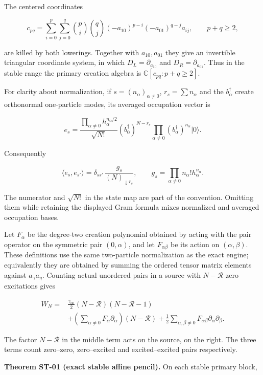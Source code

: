 \documentclass[a4paper,11pt]{article}
\numberwithin{equation}{section}
\begin{document}
The centered coordinates

\[
c_{pq}=\sum_{i=0}^{p}\sum_{j=0}^{q}
\binom{p}{i}\binom{q}{j}(-a_{10})^{p-i}(-a_{01})^{q-j}a_{ij},
\qquad p+q\geq2,
\]

are killed by both lowerings. Together with \(a_{10},a_{01}\) they give an invertible triangular coordinate system, in which \(D_L=\partial_{a_{10}}\) and \(D_R=\partial_{a_{01}}\). Thus in the stable range the primary creation algebra is \(\mathbb C[c_{pq}:p+q\geq2]\).

For clarity about normalization, if \(s=(n_\alpha)_{\alpha\ne0}\), \(r_s=\sum n_\alpha\) and the \(b_\alpha^\dagger\) create orthonormal one-particle modes, its averaged occupation vector is

\[
e_s=
\frac{\prod_{\alpha\ne0}h_\alpha^{n_\alpha/2}}{\sqrt{N!}}
(b_0^\dagger)^{N-r_s}
\prod_{\alpha\ne0}(b_\alpha^\dagger)^{n_\alpha}|0\rangle.
\]

Consequently

\[
\langle e_s,e_{s'}\rangle
=\delta_{ss'}\,\frac{g_s}{(N)_{\downarrow r_s}},
\qquad
g_s=\prod_{\alpha\ne0}n_\alpha!h_\alpha^{n_\alpha}.
\]

The numerator and \(\sqrt{N!}\) in the state map are part of the convention. Omitting them while retaining the displayed Gram formula mixes normalized and averaged occupation bases.

Let \(F_\alpha\) be the degree-two creation polynomial obtained by acting with the pair operator on the symmetric pair \((0,\alpha)\), and let \(F_{\alpha\beta}\) be its action on \((\alpha,\beta)\). These definitions use the same two-particle normalization as the exact engine; equivalently they are obtained by summing the ordered tensor matrix elements against \(a_\gamma a_\eta\). Counting actual unordered pairs in a source with \(N-\mathcal R\) zero excitations gives

\[
\begin{aligned}
W_N={}&\frac{\gamma_{00}}2(N-\mathcal R)(N-\mathcal R-1)\\
&+\left(\sum_{\alpha\ne0}F_\alpha\partial_\alpha\right)(N-\mathcal R)
+\frac12\sum_{\alpha,\beta\ne0}
F_{\alpha\beta}\partial_\alpha\partial_\beta.
\end{aligned}
\]

The factor \(N-\mathcal R\) in the middle term acts on the source, on the right. The three terms count zero--zero, zero--excited and excited--excited pairs respectively.

\textbf{Theorem ST-01 (exact stable affine pencil).} On each stable primary block,
\end{document}

